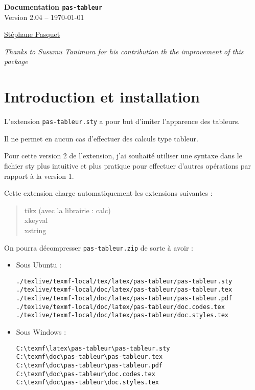 \documentclass[a4paper,french]{article}
\begin{document}
\begin{center}
\begin{tcolorbox}[head]
{\bfseries\LARGE Documentation \texttt{pas-tableur} }\\[3mm]
{\large Version 2.04 -- \today}
\end{tcolorbox}

{\large 
\href{http://www.mathweb.fr/contact.html}{St\'ephane Pasquet}}

{\small\emph{Thanks to Susumu Tanimura for his contribution th the improvement of this package}}
\end{center}

\begin{tcolorbox}[toc]
\makeatletter
{}
\makeatother
\end{tcolorbox}

\section{Introduction et installation}

L'extension \texttt{pas-tableur.sty} a pour but d'imiter l'apparence des tableurs.

Il ne permet en aucun cas d'effectuer des calculs type tableur.

\medskip

Pour cette version 2 de l'extension, j'ai souhait\'e utiliser une syntaxe dans le fichier sty plus intuitive et plus pratique pour effectuer d'autres op\'erations par rapport \`a la version 1.

\medskip

Cette extension charge automatiquement les extensions suivantes :

\medskip

\begin{quote}
tikz (avec la librairie : calc) \\
xkeyval\\
xstring
\end{quote}

\newpage

On pourra d\'ecompresser \texttt{pas-tableur.zip} 
de sorte \`a avoir :

\begin{itemize}
\item Sous Ubuntu :

\begin{verbatim}
./texlive/texmf-local/tex/latex/pas-tableur/pas-tableur.sty
./texlive/texmf-local/doc/latex/pas-tableur/pas-tableur.tex
./texlive/texmf-local/doc/latex/pas-tableur/pas-tableur.pdf
./texlive/texmf-local/doc/latex/pas-tableur/doc.codes.tex
./texlive/texmf-local/doc/latex/pas-tableur/doc.styles.tex
\end{verbatim}

\item Sous Windows :

\begin{verbatim}
C:\texmf\latex\pas-tableur\pas-tableur.sty
C:\texmf\doc\pas-tableur\pas-tableur.tex
C:\texmf\doc\pas-tableur\pas-tableur.pdf
C:\texmf\doc\pas-tableur\doc.codes.tex
C:\texmf\doc\pas-tableur\doc.styles.tex
\end{verbatim}
\end{itemize}
\end{document}
